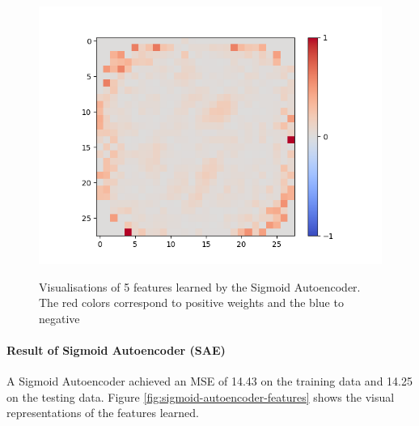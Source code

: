 \begin{figure}[H]
\begin{minipage}[b]{0.19\textwidth}
		\includegraphics[width=\textwidth]{Linear-AE/Feature-18.png}
		\label{}
	\end{minipage}
	
	\caption{Visualisations of 5 features learned by the Sigmoid Autoencoder. The red colors correspond to positive weights and the blue to negative}
	\label{fig:linear-autoencoder-features}
	\hfill
\end{figure}

\paragraph{Result of Sigmoid Autoencoder (SAE)}
A Sigmoid Autoencoder achieved an MSE of 14.43 on the training data and 14.25 on the testing data. Figure \ref{fig:sigmoid-autoencoder-features} shows the visual representations of the features learned.

